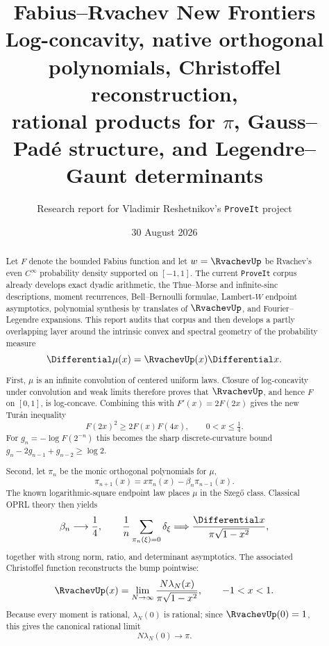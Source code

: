 \documentclass[11pt,oneside]{article}
\title{\bfseries Fabius--Rvachev New Frontiers\\[0.45em]
\large Log-concavity, native orthogonal polynomials, Christoffel reconstruction,\\
rational products for $\pi$, Gauss--Pad\'e structure, and Legendre--Gaunt determinants}
\author{Research report for Vladimir Reshetnikov's \texttt{ProveIt} project}
\date{30 August 2026}
\theoremstyle{definition}
\theoremstyle{remark}
\numberwithin{equation}{section}
\begin{document}
\maketitle

\begin{abstract}
Let $F$ denote the bounded Fabius function and let $w=\RvachevUp$ be Rvachev's even
$C^\infty$ probability density supported on $[-1,1]$.  The current
\texttt{ProveIt} corpus already develops exact dyadic arithmetic, the
Thue--Morse and infinite-sinc descriptions, moment recurrences, Bell--Bernoulli
formulae, Lambert-$W$ endpoint asymptotics, polynomial synthesis by translates
of $\RvachevUp$, and Fourier--Legendre expansions.  This report audits that corpus and
then develops a partly overlapping layer around the intrinsic convex and
spectral geometry of the probability measure
\[
  \Differential\mu(x)=\RvachevUp(x)\Differential x.
\]

First, $\mu$ is an infinite convolution of centered uniform laws.  Closure of
log-concavity under convolution and weak limits therefore proves that $\RvachevUp$,
and hence $F$ on $[0,1]$, is log-concave.  Combining this with
$F'(x)=2F(2x)$ gives the new Tur\'an inequality
\[
  F(2x)^2\ge 2F(x)F(4x),\qquad 0<x\le\tfrac14.
\]
For $g_n=-\log F(2^{-n})$ this becomes the sharp discrete-curvature bound
$g_n-2g_{n-1}+g_{n-2}\ge\log2$.

Second, let $\pi_n$ be the monic orthogonal polynomials for $\mu$,
\[
 \pi_{n+1}(x)=x\pi_n(x)-\beta_n\pi_{n-1}(x).
\]
The known logarithmic-square endpoint law places $\mu$ in the Szeg\H{o} class.
Classical OPRL theory then yields
\[
 \beta_n\longrightarrow\frac14,
 \qquad
 \frac1n\sum_{\pi_n(\xi)=0}\delta_\xi
   \Longrightarrow \frac{\Differential x}{\pi\sqrt{1-x^2}},
\]
together with strong norm, ratio, and determinant asymptotics.  The associated
Christoffel function reconstructs the bump pointwise:
\[
 \RvachevUp(x)=\lim_{N\to\infty}
 \frac{N\lambda_N(x)}{\pi\sqrt{1-x^2}},\qquad -1<x<1.
\]
Because every moment is rational, $\lambda_N(0)$ is rational; since
$\RvachevUp(0)=1$, this gives the canonical rational limit
\[
  N\lambda_N(0)\longrightarrow\pi.
\]


\end{abstract}
\end{document}
